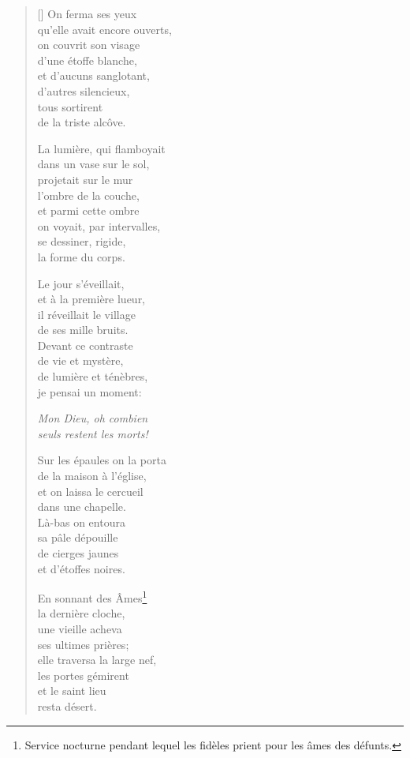 \documentclass[a4paper,12pt]{book}
\begin{document}
\settowidth{\versewidth}{D'une horloge on entendait}

\begin{verse}[\versewidth]
  On ferma ses yeux \\
  qu'elle avait encore ouverts, \\
  on couvrit son visage \\
  d'une étoffe blanche, \\
  et d'aucuns sanglotant, \\
  d'autres silencieux, \\
  tous sortirent \\
  de la triste alcôve.

  La lumière, qui flamboyait \\
  dans un vase sur le sol, \\
  projetait sur le mur \\
  l'ombre de la couche, \\
  et parmi cette ombre \\
  on voyait, par intervalles, \\
  se dessiner, rigide, \\
  la forme du corps.

  Le jour s'éveillait, \\
  et à la première lueur, \\
  il réveillait le village \\
  de ses mille bruits. \\
  Devant ce contraste \\
  de vie et mystère, \\
  de lumière et ténèbres, \\
  je pensai un moment:

  \emph{Mon Dieu, oh combien \\
  seuls restent les morts!}

  Sur les épaules on la porta \\
  de la maison à l'église, \\
  et on laissa le cercueil \\
  dans une chapelle. \\
  Là-bas on entoura \\
  sa pâle dépouille \\
  de cierges jaunes \\
  et d'étoffes noires.

  En sonnant des Âmes\footnote{Service nocturne pendant lequel les
  fidèles prient pour les âmes des défunts.} \\
  la dernière cloche, \\
  une vieille acheva \\
  ses ultimes prières; \\
  elle traversa la large nef, \\
  les portes gémirent \\
  et le saint lieu \\
  resta désert.


\end{verse}
\end{document}
